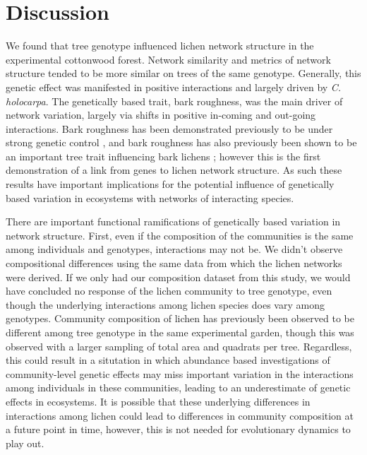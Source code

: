 \documentclass[11pt,twocolumn,twoside,lineno]{pnas-new}
\begin{document}


\section*{Discussion}


We found that tree genotype influenced lichen network structure in the
experimental cottonwood forest. Network similarity and metrics of
network structure tended to be more similar on trees of the same
genotype. Generally, this genetic effect was manifested in positive
interactions and largely driven by \textit{C. holocarpa}. The
genetically based trait, bark roughness, was the main driver of
network variation, largely via shifts in positive in-coming and
out-going interactions. Bark roughness has been demonstrated
previously to be under strong genetic control \cite{Bdeir2017}, and
bark roughness has also previously been shown to be an important tree
trait influencing bark lichens \cite{Lamit2015a}; however this is the
first demonstration of a link from genes to lichen network structure.
As such these results have important implications for the potential
influence of genetically based variation in ecosystems with networks
of interacting species.

There are important functional ramifications of genetically based
variation in network structure. First, even if the composition of the
communities is the same among individuals and genotypes, interactions
may not be. We didn't observe compositional differences using the same
data from which the lichen networks were derived. If we only had our
composition dataset from this study, we would have concluded no
response of the lichen community to tree genotype, even though the
underlying interactions among lichen species does vary among
genotypes. Community composition of lichen has previously been
observed to be different among tree genotype in the same experimental
garden, though this was observed with a larger sampling of total area
and quadrats per tree. Regardless, this could result in a situtation
in which abundance based investigations of community-level genetic
effects may miss important variation in the interactions among
individuals in these communities, leading to an underestimate of
genetic effects in ecosystems. It is possible that these underlying
differences in interactions among lichen could lead to differences in
community composition at a future point in time, however, this is not
needed for evolutionary dynamics to play out.
\end{document}
